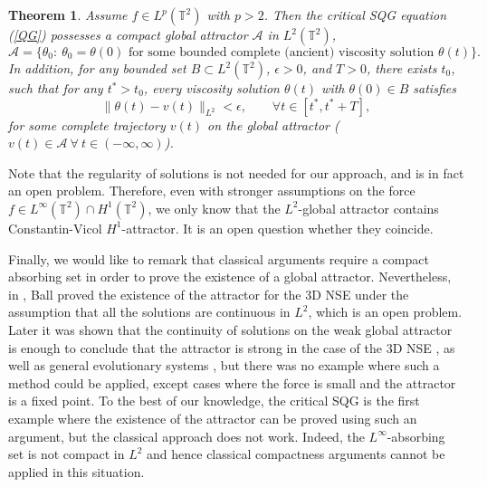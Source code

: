 \documentclass{amsart}
\newcommand{\As}{\mathcal{A}_{\mathrm{s}}}
\newcommand{\A}{\mathcal{A}}
\newtheorem {Theorem}  {Theorem}
\numberwithin{Theorem}{section}
\theoremstyle{definition}
\theoremstyle{remark}
\newcounter{remark}
\renewcommand{\th}{\theta}
\begin{document}


\begin{Theorem}\label{thm:attractor-intro}
Assume $f\in L^p(\mathbb T^2)$ with $p>2$. Then the critical SQG equation (\ref{QG}) possesses a compact global attractor $\A$ in
$L^2(\mathbb T^2)$,
\[
\A=\{ \theta_0: \ \theta_0=\theta(0) \mbox{ for some bounded complete (ancient) viscosity solution } \theta(t) \}.
\] 
In addition, for any bounded set $B \subset L^2(\mathbb T^2)$, $\epsilon >0$, and $T>0$, there exists $t_0$,
such that for any $t^*>t_0$,  every viscosity solution $\theta(t)$ with $\th(0) \in B$
satisfies
\[
\|\theta(t)- v(t)\|_{L^2} < \epsilon, \qquad \forall t\in [t^*,t^*+T],
\]
for some complete trajectory $v(t)$ on the global attractor ($v(t) \in \A \ \forall \ t \in(-\infty, \infty)$).

\end{Theorem}




\medskip

Note that the regularity of solutions is not needed for our approach, and is in fact an open problem. Therefore, even with stronger assumptions
on the force $f\in L^\infty(\mathbb T^2)\cap H^1(\mathbb T^2)$, we only know that the $L^2$-global attractor contains Constantin-Vicol $H^1$-attractor.
 It is an open question whether they coincide.

Finally, we would like to remark that classical arguments require a compact absorbing set in order to prove the existence of a global attractor.  Nevertheless, in \cite{B}, Ball proved the existence of the attractor for the 3D NSE
under the assumption that all the solutions are continuous in $L^2$, which is an open problem.
Later it was shown that the continuity of solutions on the weak global attractor
is enough to conclude that the attractor is strong in the case of the 3D NSE \cite{CF,R}, as well as general evolutionary systems \cite{C5},  but there was no example where
such a method could be applied, except cases where the force is small and the attractor is a fixed point.
To the best of our knowledge, the critical SQG is the first example where
 the existence of the attractor can be proved using such an argument, but the classical approach does not work.
 Indeed, the $L^\infty$-absorbing set is not compact in $L^2$ and hence classical
compactness arguments cannot be applied in this situation.
\end{document}

